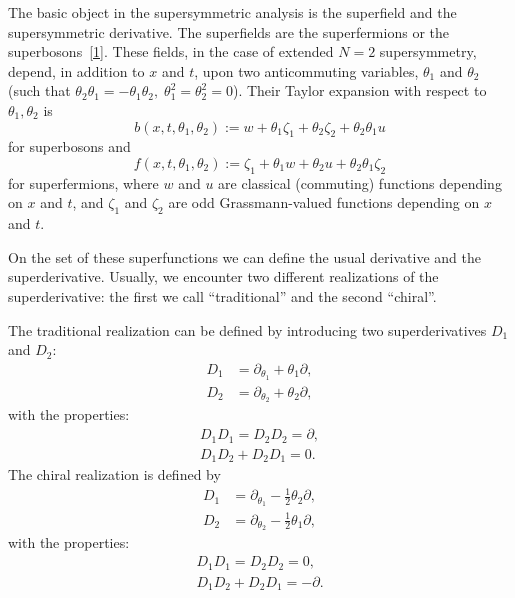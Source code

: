 {The basic object in the supersymmetric analysis is the superfield and
the supersymmetric derivative.  The superfields are the superfermions
or the superbosons~\hyperlink{susy2-bib}{[1]}.  These fields, in the
case of extended $N=2$ supersymmetry, depend, in addition to $x$ and
$t$, upon two anticommuting variables, $\theta_{1}$ and $\theta_{2}$
(such that $\theta_{2}\theta_{1} = -
\theta_{1}\theta_{2},\;\theta_{1}^{2} = \theta_{2}^{2} = 0$).  Their
Taylor expansion with respect to $\theta_{1},\theta_{2}$ is
\begin{equation*}
  b(x,t,\theta_{1},\theta_{2}):=w+\theta_{1}\zeta_{1}+
  \theta_{2}\zeta_{2}+\theta_{2}\theta_{1}u
\end{equation*}
for superbosons and
\begin{equation*}
  f(x,t,\theta_{1},\theta_{2}):=\zeta_{1}+\theta_{1}w+
  \theta_{2}u+\theta_{2}\theta_{1}\zeta_{2}
\end{equation*}
for superfermions, where $w$ and $u$ are classical (commuting)
functions depending on $x$ and $t$, and $\zeta_{1}$ and $\zeta_{2}$
are odd Grassmann-valued functions depending on $x$ and $t$.

On the set of these superfunctions we can define the usual derivative
and the superderivative.  Usually, we encounter two different
realizations of the superderivative: the first we call ``traditional''
and the second ``chiral''.

The traditional realization can be defined by introducing two
superderivatives $D_{1}$ and $D_{2}$:
\begin{align*}
  D_{1} &= \partial_{\theta_{1}}+\theta_{1}\partial,\\
  D_{2} &= \partial_{\theta_{2}}+\theta_{2}\partial,
\end{align*}
with the properties:
\begin{gather*}
  D_{1} D_{1} = D_{2} D_{2} = \partial,\\
  D_{1} D_{2} + D_{2} D_{1} = 0.
\end{gather*}
The chiral realization is defined by
\begin{align*}
  D_{1} &= \partial_{\theta_{1}} - \frac{1}{2}\theta_{2}\partial,\\
  D_{2} &= \partial_{\theta_{2}} - \frac{1}{2}\theta_{1}\partial,
\end{align*}
with the properties:
\begin{gather*}
  D_{1} D_{1} = D_{2} D_{2} = 0,\\
  D_{1} D_{2} + D_{2} D_{1} = -\partial.
\end{gather*}

}
